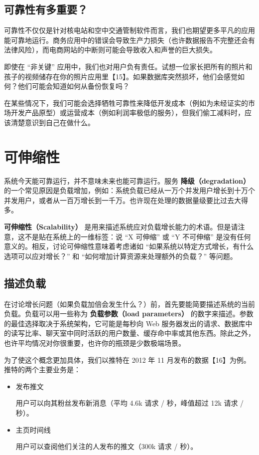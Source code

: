 \subsection{可靠性有多重要？}

可靠性不仅仅是针对核电站和空中交通管制软件而言，我们也期望更多平凡的应用能可靠地运行。商务应用中的错误会导致生产力损失（也许数据报告不完整还会有法律风险），而电商网站的中断则可能会导致收入和声誉的巨大损失。

即使在 “非关键” 应用中，我们也对用户负有责任。试想一位家长把所有的照片和孩子的视频储存在你的照片应用里【15】。如果数据库突然损坏，他们会感觉如何？他们可能会知道如何从备份恢复吗？

在某些情况下，我们可能会选择牺牲可靠性来降低开发成本（例如为未经证实的市场开发产品原型）或运营成本（例如利润率极低的服务），但我们偷工减料时，应该清楚意识到自己在做什么。

\section{可伸缩性}
\label{sec:scalability}

系统今天能可靠运行，并不意味未来也能可靠运行。服务 \textbf{降级（degradation）} 的一个常见原因是负载增加，例如：系统负载已经从一万个并发用户增长到十万个并发用户，或者从一百万增长到一千万。也许现在处理的数据量级要比过去大得多。

\textbf{可伸缩性（Scalability）} 是用来描述系统应对负载增长能力的术语。但是请注意，这不是贴在系统上的一维标签：说 “X 可伸缩” 或 “Y 不可伸缩” 是没有任何意义的。相反，讨论可伸缩性意味着考虑诸如 “如果系统以特定方式增长，有什么选项可以应对增长？” 和 “如何增加计算资源来处理额外的负载？” 等问题。

\subsection{描述负载}

在讨论增长问题（如果负载加倍会发生什么？）前，首先要能简要描述系统的当前负载。负载可以用一些称为 \textbf{负载参数（load parameters）} 的数字来描述。参数的最佳选择取决于系统架构，它可能是每秒向 Web 服务器发出的请求、数据库中的读写比率、聊天室中同时活跃的用户数量、缓存命中率或其他东西。除此之外，也许平均情况对你很重要，也许你的瓶颈是少数极端场景。

为了使这个概念更加具体，我们以推特在 2012 年 11 月发布的数据【16】为例。推特的两个主要业务是：

\begin{itemize}
  \item
        发布推文

        用户可以向其粉丝发布新消息（平均 4.6k 请求 / 秒，峰值超过 12k 请求 /秒）。
  \item
        主页时间线

        用户可以查阅他们关注的人发布的推文（300k 请求 / 秒）。
\end{itemize}

